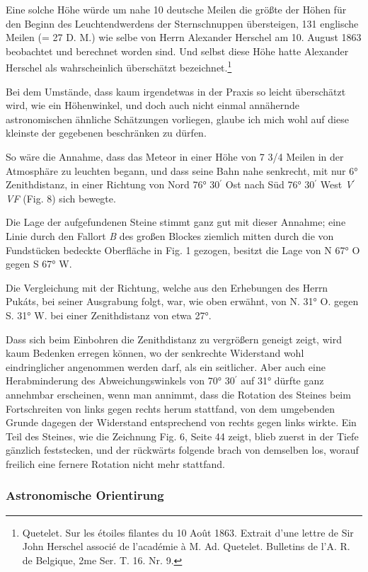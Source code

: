 \documentclass[a4paper, 11pt, oneside, german]{article}
\begin{document}
Eine solche Höhe würde um nahe 10 deutsche Meilen die größte der Höhen für den Beginn des Leuchtendwerdens der Sternschnuppen übersteigen, 131 englische Meilen (= 27 D. M.) wie selbe von Herrn Alexander Herschel am 10. August 1863 beobachtet und berechnet worden sind. Und selbst diese Höhe hatte Alexander Herschel als wahrscheinlich überschätzt bezeichnet.\footnote{Quetelet. Sur les étoiles filantes du 10 Août 1863. Extrait d'une lettre de Sir John Herschel associé de l'académie à M. Ad. Quetelet. Bulletins de l'A. R. de Belgique, 2me Ser. T. 16. Nr. 9.}

Bei dem Umstände, dass kaum irgendetwas in der Praxis so leicht überschätzt wird, wie ein Höhenwinkel, und doch auch nicht einmal annähernde astronomischen ähnliche Schätzungen vorliegen, glaube ich mich wohl auf diese kleinste der gegebenen beschränken zu dürfen.

So wäre die Annahme, dass das Meteor in einer Höhe von 7 3/4 Meilen in der Atmosphäre zu leuchten begann, und dass seine Bahn nahe senkrecht, mit nur 6° Zenithdistanz, in einer Richtung von Nord 76° 30$^{\prime}$ Ost nach Süd 76° 30$^{\prime}$ West \emph{V$^{\prime}$VF} (Fig. 8) sich bewegte.

Die Lage der aufgefundenen Steine stimmt ganz gut mit dieser Annahme; eine Linie durch den Fallort \emph{B} des großen Blockes ziemlich mitten durch die von Fundstücken bedeckte Oberfläche in Fig. 1 gezogen, besitzt die Lage von N 67° O gegen S 67° W.

Die Vergleichung mit der Richtung, welche aus den Erhebungen des Herrn Pukáts, bei seiner Ausgrabung folgt, war, wie oben erwähnt, von N. 31° O. gegen S. 31° W. bei einer Zenithdistanz von etwa 27°.

Dass sich beim Einbohren die Zenithdistanz zu vergrößern geneigt zeigt, wird kaum Bedenken erregen können, wo der senkrechte Widerstand wohl eindringlicher angenommen werden darf, als ein seitlicher. Aber auch eine Herabminderung des Abweichungswinkels von 70° 30$^{\prime}$ auf 31° dürfte ganz annehmbar erscheinen, wenn man annimmt, dass die Rotation des Steines beim Fortschreiten von links gegen rechts herum stattfand, von dem umgebenden Grunde dagegen der Widerstand entsprechend von rechts gegen links wirkte. Ein Teil des Steines, wie die Zeichnung Fig. 6, Seite 44 zeigt, blieb zuerst in der Tiefe gänzlich feststecken, und der rückwärts folgende brach von demselben los, worauf freilich eine fernere Rotation nicht mehr stattfand.
\clearpage
\subsubsection{Astronomische Orientirung}
\end{document}
